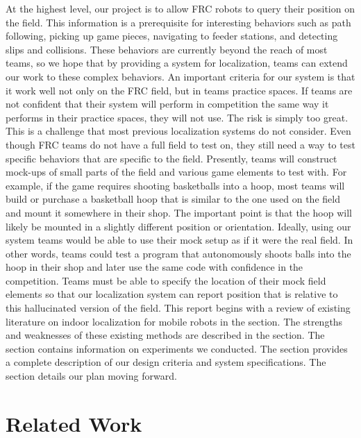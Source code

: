 \documentclass{article}
\begin{document}
	At the highest level, our project is to allow FRC robots to query their position on the field. This information is a prerequisite for interesting behaviors such as path following, picking up game pieces, navigating to feeder stations, and detecting slips and collisions. These behaviors are currently beyond the reach of most teams, so we hope that by providing a system for localization, teams can extend our work to these complex behaviors. An important criteria for our system is that it work well not only on the FRC field, but in teams practice spaces. If teams are not confident that their system will perform in competition the same way it performs in their practice spaces, they will not use. The risk is simply too great. This is a challenge that most previous localization systems do not consider. Even though FRC teams do not have a full field to test on, they still need a way to test specific behaviors that are specific to the field. Presently, teams will construct mock-ups of small parts of the field and various game elements to test with. For example, if the game requires shooting basketballs into a hoop, most teams will build or purchase a basketball hoop that is similar to the one used on the field and mount it somewhere in their shop. The important point is that the hoop will likely be mounted in a slightly different position or orientation. Ideally, using our system teams would be able to use their mock setup as if it were the real field. In other words, teams could test a program that autonomously shoots balls into the hoop in their shop and later use the same code with confidence in the competition. Teams must be able to specify the location of their mock field elements so that our localization system can report position that is relative to this hallucinated version of the field.
	This report begins with a review of existing literature on indoor localization for mobile robots in the  section. The strengths and weaknesses of these existing methods are described in the  section. The  section contains information on experiments we conducted. The  section provides a complete description of our design criteria and system specifications. The  section details our plan moving forward.

\section{Related Work} \label{related_work}
\end{document}
